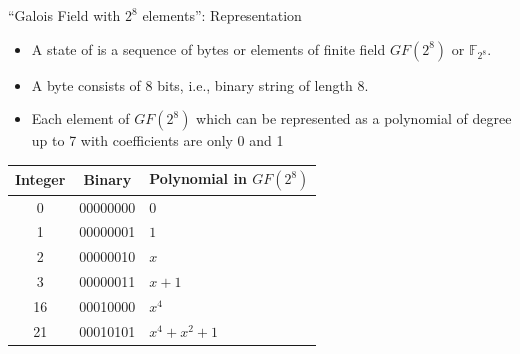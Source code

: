 \documentclass{cubeamer}
\begin{document}
\begin{frame}{``Galois Field with $2^8$ elements'': Representation}
    \begin{itemize}
        \item A state of  is a sequence of bytes or elements of finite field $GF(2^8)$ or $\mathbb{F}_{2^{8}}$.
        \pause
        \item A byte consists of 8 bits, i.e., binary string of length 8.
         \pause
        \item Each element of $GF(2^8)$ which can be represented as a polynomial of degree up to 7 with coefficients are only 0 and 1
    \end{itemize}
    \vspace{0.5em}
    \begin{center}
        \renewcommand{\arraystretch}{1.2}
        \begin{tabular}{c c l}
            \toprule
            \textbf{Integer} & \textbf{Binary} & \textbf{Polynomial in $GF(2^8)$} \\
            \midrule
            0  & 00000000 & $0$ \\
            1  & 00000001 & $1$ \\
            2  & 00000010 & $x$ \\
            3  & 00000011 & $x + 1$ \\
            16 & 00010000 & $x^4$ \\
            21 & 00010101 & $x^4 + x^2 + 1$ \\
            \bottomrule
        \end{tabular}
    \end{center}
\end{frame}
\end{document}
